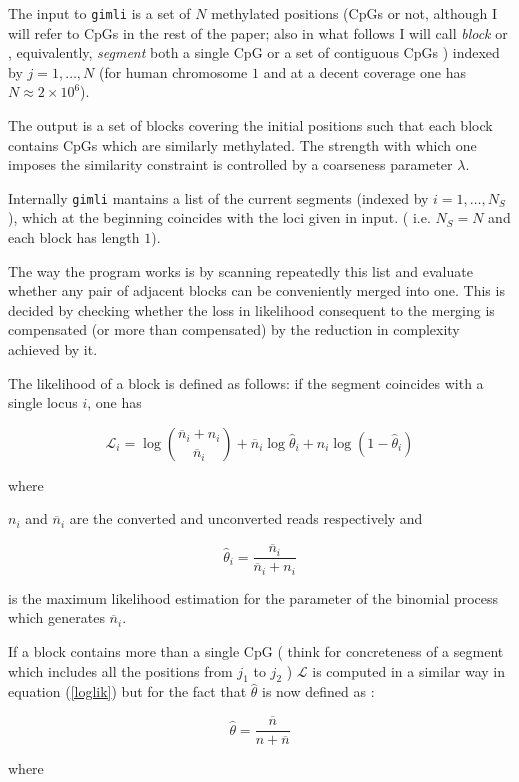 \documentclass[12pt]{amsart}
\newcommand{\lik}{\ensuremath{\mathcal{L}}}
\newcommand{\gimli}{\texttt{gimli}}
\begin{document}
The  input to \gimli{} is a set of $N$ methylated positions 
(CpGs or not, although I will refer to CpGs in the rest of the paper; also in what
follows I will call {\em block} or ,
equivalently, {\em segment}
both a single CpG or a set of contiguous CpGs ) indexed by $j=1,\dots,N$ 
(for human chromosome $1$ and at a 
decent coverage one has $N \approx 2\times 10^6$).

The output is a set of blocks 
covering the initial positions 
such that each block contains CpGs which are similarly
methylated. The strength with which
one imposes the similarity constraint
is controlled by a coarseness parameter $\lambda$.

Internally \gimli{} mantains a list of the current  
segments (indexed by $i=1,\dots,N_S$), 
which at the beginning 
coincides with the loci given in input. 
( i.e.  $N_S=N$ and each block has length $1$). 

The way the program works is by 
scanning repeatedly this list and evaluate whether any pair 
of adjacent blocks can be conveniently merged into one.  
This is decided by checking whether the loss in 
likelihood consequent to the merging is compensated 
(or more than compensated)
by the reduction in complexity achieved by it.

The likelihood of a block is defined as follows: if the
segment coincides with a single locus $i$, one has

\begin{equation}
\lik_i=\log {\overline{n}_i+n_i \choose \overline{n}_i} +
	{\overline{n}_i}\log\hat{\theta}_i+
	n_i\log(1-\hat{\theta}_i)
\end{equation}
\label{loglik}

where

$n_i$ and $\overline{n}_i$ are the converted and unconverted reads respectively 
and

\[\hat{\theta}_i=\frac{\overline{n}_i}{\overline{n}_i+n_i}\]

is the maximum likelihood estimation for the parameter of the binomial process 
which generates $\overline{n}_i$.

If a block contains  more than a single CpG  
( think for concreteness of a segment which includes all the positions from 
$j_1$ to $j_2$ ) $\lik$ is 
computed in a similar way in equation (\ref{loglik}) but for the fact that $\hat{\theta}$ is now
defined as :

\[
\hat{\theta}=\frac{\overline{n}}{n + \overline{n}}
\]

where
\end{document}
